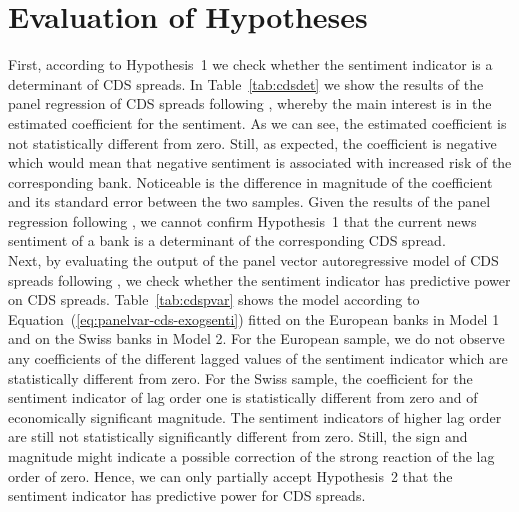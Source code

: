 \section{Evaluation of Hypotheses} \label{sec:results}

First, according to \mbox{Hypothesis~1} we check whether the sentiment indicator is a determinant of CDS spreads. In \mbox{Table~\ref{tab:cdsdet}} we show the results of the panel regression of CDS spreads following \cite{annaert2013}, whereby the main interest is in the estimated coefficient for the sentiment. As we can see, the estimated coefficient is not statistically different from zero. Still, as expected, the coefficient is negative which would mean that negative sentiment is associated with increased risk of the corresponding bank. Noticeable is the difference in magnitude of the coefficient and its standard error between the two samples. Given the results of the panel regression following \cite{annaert2013}, we cannot confirm \mbox{Hypothesis~1} that the current news sentiment of a bank is a determinant of the corresponding CDS spread. \\



Next, by evaluating the output of the panel vector autoregressive model of CDS spreads following \cite{cathcart2020}, we check whether the sentiment indicator has predictive power on CDS spreads. \mbox{Table~\ref{tab:cdspvar}} shows the model according to \mbox{Equation~(\ref{eq:panelvar-cds-exogsenti})} fitted on the European banks in Model 1 and on the Swiss banks in Model 2. For the European sample, we do not observe any coefficients of the different lagged values of the sentiment indicator which are statistically different from zero. For the Swiss sample, the coefficient for the sentiment indicator of lag order one is statistically different from zero and of economically significant magnitude. The sentiment indicators of higher lag order are still not statistically significantly different from zero. Still, the sign and magnitude might indicate a possible correction of the strong reaction of the lag order of zero. Hence, we can only partially accept \mbox{Hypothesis~2} that the sentiment indicator has predictive power for CDS spreads. \\



